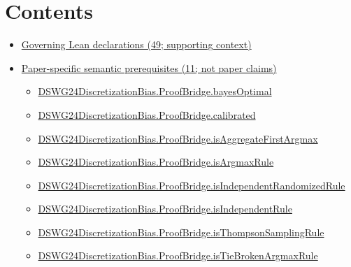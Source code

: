 \documentclass[10pt]{article}
\begin{document}
\section*{Contents}
\begin{itemize}[leftmargin=1.2em]
\item \hyperlink{governing-declaration-section-5ef5ef0364b6939c}{Governing Lean declarations (49; supporting context)}
\item \hyperlink{paper-prerequisite-section-5ef5ef0364b6939c}{Paper-specific semantic prerequisites (11; not paper claims)}
\begin{itemize}[leftmargin=1.2em]
\item \hyperlink{paper-prerequisite-c793e07e52a48893}{DSWG24\allowbreak{}Discretization\allowbreak{}Bias.\allowbreak{}Proof\allowbreak{}Bridge.\allowbreak{}bayes\allowbreak{}Optimal}
\item \hyperlink{paper-prerequisite-c94cbc772446ffec}{DSWG24\allowbreak{}Discretization\allowbreak{}Bias.\allowbreak{}Proof\allowbreak{}Bridge.\allowbreak{}calibrated}
\item \hyperlink{paper-prerequisite-46e579d6fcd53814}{DSWG24\allowbreak{}Discretization\allowbreak{}Bias.\allowbreak{}Proof\allowbreak{}Bridge.\allowbreak{}is\allowbreak{}Aggregate\allowbreak{}First\allowbreak{}Argmax}
\item \hyperlink{paper-prerequisite-2e16c9b0a6f0db1c}{DSWG24\allowbreak{}Discretization\allowbreak{}Bias.\allowbreak{}Proof\allowbreak{}Bridge.\allowbreak{}is\allowbreak{}Argmax\allowbreak{}Rule}
\item \hyperlink{paper-prerequisite-536b545abe995da0}{DSWG24\allowbreak{}Discretization\allowbreak{}Bias.\allowbreak{}Proof\allowbreak{}Bridge.\allowbreak{}is\allowbreak{}Independent\allowbreak{}Randomized\allowbreak{}Rule}
\item \hyperlink{paper-prerequisite-45b940eee9bfbd29}{DSWG24\allowbreak{}Discretization\allowbreak{}Bias.\allowbreak{}Proof\allowbreak{}Bridge.\allowbreak{}is\allowbreak{}Independent\allowbreak{}Rule}
\item \hyperlink{paper-prerequisite-29d817bb87f95d82}{DSWG24\allowbreak{}Discretization\allowbreak{}Bias.\allowbreak{}Proof\allowbreak{}Bridge.\allowbreak{}is\allowbreak{}Thompson\allowbreak{}Sampling\allowbreak{}Rule}
\item \hyperlink{paper-prerequisite-f1caeaac865e715b}{DSWG24\allowbreak{}Discretization\allowbreak{}Bias.\allowbreak{}Proof\allowbreak{}Bridge.\allowbreak{}is\allowbreak{}Tie\allowbreak{}Broken\allowbreak{}Argmax\allowbreak{}Rule}

\end{itemize}
\end{itemize}
\end{document}
